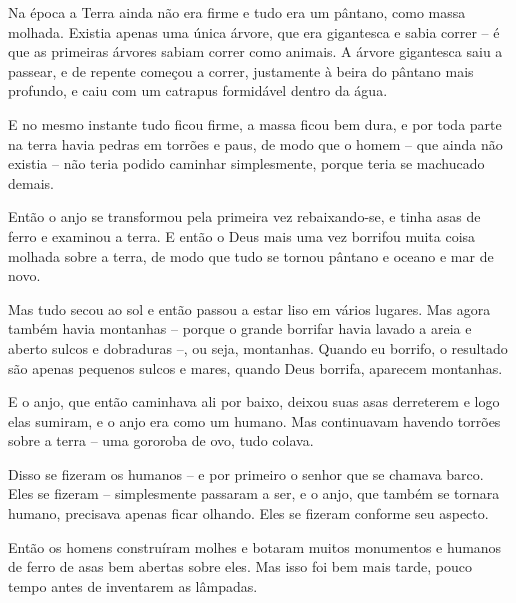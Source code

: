 Na época a Terra ainda não era firme e tudo era um pântano, como massa
molhada. Existia apenas uma única árvore, que era gigantesca e sabia
correr -- é que as primeiras árvores sabiam correr como animais. A
árvore gigantesca saiu a passear, e de repente começou a correr,
justamente à beira do pântano mais profundo, e caiu com um catrapus
formidável dentro da água.

E no mesmo instante tudo ficou firme, a massa ficou bem dura, e por toda
parte na terra havia pedras em torrões e paus, de modo que o homem --
que ainda não existia -- não teria podido caminhar simplesmente, porque
teria se machucado demais.

Então o anjo se transformou pela primeira vez rebaixando-se, e tinha
asas de ferro e examinou a terra. E então o Deus mais uma vez borrifou
muita coisa molhada sobre a terra, de modo que tudo se tornou pântano e
oceano e mar de novo.

Mas tudo secou ao sol e então passou a estar liso em vários lugares. Mas
agora também havia montanhas -- porque o grande borrifar havia lavado a
areia e aberto sulcos e dobraduras --, ou seja, montanhas. Quando eu
borrifo, o resultado são apenas pequenos sulcos e mares, quando Deus
borrifa, aparecem montanhas.

E o anjo, que então caminhava ali por baixo, deixou suas asas derreterem
e logo elas sumiram, e o anjo era como um humano. Mas continuavam
havendo torrões sobre a terra -- uma gororoba de ovo, tudo colava.

Disso se fizeram os humanos -- e por primeiro o senhor que se chamava
barco. Eles se fizeram -- simplesmente passaram a ser, e o anjo, que
também se tornara humano, precisava apenas ficar olhando. Eles se
fizeram conforme seu aspecto.

Então os homens construíram molhes e botaram muitos monumentos e humanos
de ferro de asas bem abertas sobre eles. Mas isso foi bem mais tarde,
pouco tempo antes de inventarem as lâmpadas.


